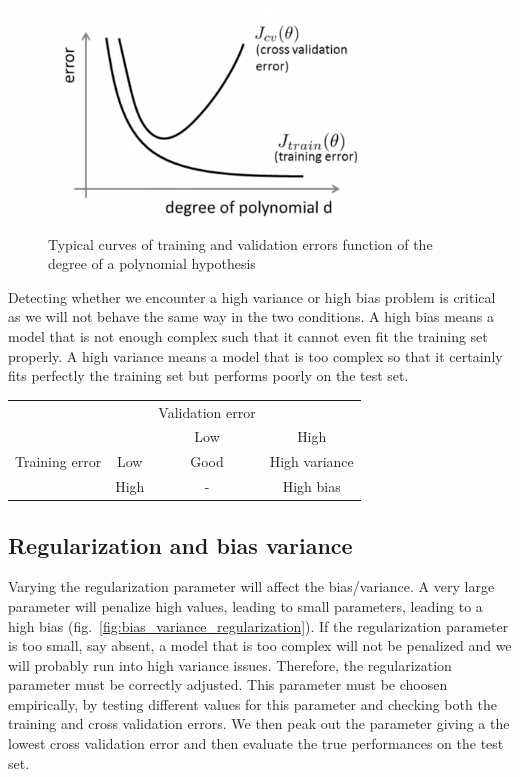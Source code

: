 \documentclass[10pt,a4paper]{article}
\begin{document}
\begin{figure}[htbp]
\includegraphics[width=0.5\columnwidth]{./Figs/crossvalidation_training_errors.png}
\caption{\label{fig:crossvalidation_training_errors}Typical curves of training and validation errors function of the degree of a polynomial hypothesis}
\end{figure}

Detecting whether we encounter a high variance or high bias problem is critical as we will not behave the same way in the two conditions. A high bias means a model that is not enough complex such that it cannot even fit the training set properly. A high variance means a model that is too complex so that it certainly fits perfectly the training set but performs poorly on the test set.

\begin{tabular}{|c|c|c|c|}
                &      & Validation error &      \\
                &      & Low              & High \\
\hline
Training error  & Low  & Good             & High variance \\
                & High &  -               & High bias \\
\end{tabular}


\subsection{Regularization and bias variance}

Varying the regularization parameter will affect the bias/variance. A very large parameter will penalize high values, leading to small parameters, leading to a high bias (fig.~\ref{fig:bias_variance_regularization}). If the regularization parameter is too small, say absent, a model that is too complex will not be penalized and we will probably run into high variance issues. Therefore, the regularization parameter must be correctly adjusted. This parameter must be choosen empirically, by testing different values for this parameter and checking both the training and cross validation errors. We then peak out the parameter giving a the lowest cross validation error and then evaluate the true performances on the test set.
\end{document}
